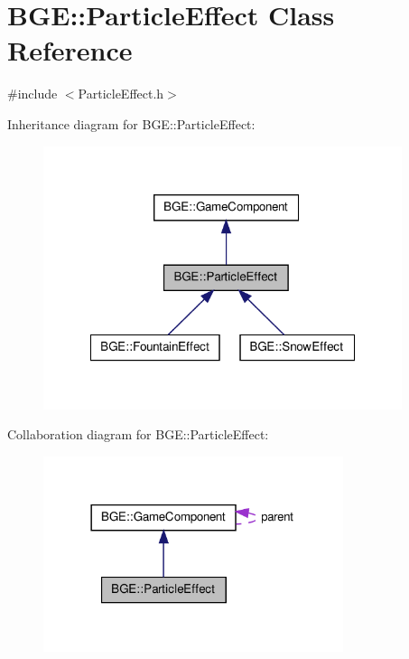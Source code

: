 \hypertarget{class_b_g_e_1_1_particle_effect}{\section{B\-G\-E\-:\-:Particle\-Effect Class Reference}
\label{class_b_g_e_1_1_particle_effect}
}


{\ttfamily \#include $<$Particle\-Effect.\-h$>$}



Inheritance diagram for B\-G\-E\-:\-:Particle\-Effect\-:
\nopagebreak
\begin{figure}[H]
\begin{center}
\leavevmode
\includegraphics[width=298pt]{class_b_g_e_1_1_particle_effect__inherit__graph}
\end{center}
\end{figure}


Collaboration diagram for B\-G\-E\-:\-:Particle\-Effect\-:
\nopagebreak
\begin{figure}[H]
\begin{center}
\leavevmode
\includegraphics[width=249pt]{class_b_g_e_1_1_particle_effect__coll__graph}
\end{center}
\end{figure}
